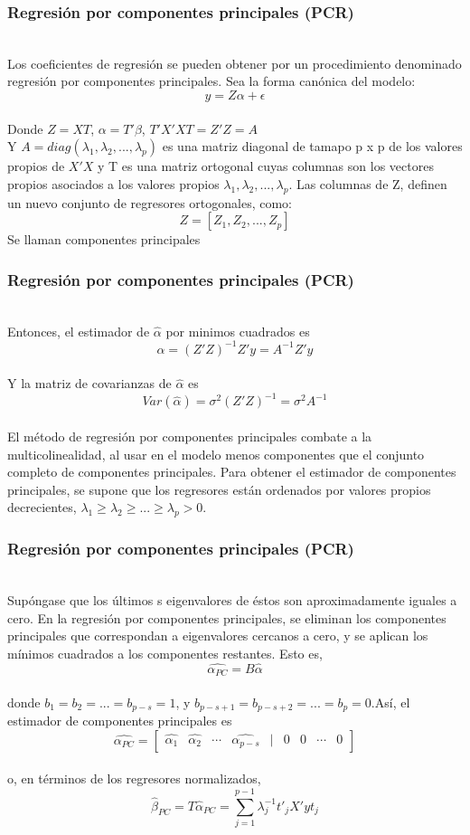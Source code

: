 \documentclass[12pt]{beamer}
\begin{document}
\begin{frame}
\frametitle{Regresión por componentes principales (PCR)}
~\\Los coeficientes de regresión se pueden obtener por un procedimiento denominado regresión por componentes principales. Sea la forma canónica del modelo:
$$y=Z\alpha+\epsilon$$
~\\Donde $Z=XT$, $\alpha=T'\beta$,  $T'X'XT=Z'Z=A$ 
~\\Y $A=diag(\lambda_{1},\lambda_{2},...,\lambda_{p})$ es una matriz diagonal de tamapo p x p de los valores propios de $X'X$ y T es una matriz ortogonal cuyas columnas son los vectores propios asociados a los valores propios $\lambda_{1},\lambda_{2},...,\lambda_{p}$. Las columnas de Z, definen un nuevo conjunto de regresores ortogonales, como:
$$Z=[Z_{1},Z_{2},...,Z_{p}]$$ Se llaman componentes principales
\end{frame}

\begin{frame}
\frametitle{Regresión por componentes principales (PCR)}
~\\Entonces, el estimador de $\hat{\alpha}$ por minimos cuadrados es
$$\hat{\alpha}=(Z'Z)^{-1}Z'y= A^{-1}Z'y$$
~\\Y la matriz de covarianzas de $\hat{\alpha}$ es 
$$Var(\hat{\alpha})=\sigma^2 (Z'Z)^{-1}=\sigma^2 A^{-1}$$
~\\El método de regresión por componentes principales combate a la multicolinealidad,
al usar en el modelo menos componentes que el conjunto completo de componentes principales. Para obtener el estimador de componentes principales, se supone que los regresores están ordenados por valores propios decrecientes, $\lambda_{1}\geq\lambda_{2}\geq...\geq\lambda_{p}>0$.
\end{frame}

\begin{frame}
\frametitle{Regresión por componentes principales (PCR)}
~\\Supóngase que los últimos s eigenvalores de éstos son aproximadamente iguales a cero. En la regresión por componentes principales, se eliminan los componentes principales que correspondan a eigenvalores cercanos a cero, y se aplican los mínimos cuadrados a los componentes restantes.
Esto es,
$$\hat{\alpha_{PC}}=B\hat{\alpha}$$
~\\donde $b_{1}=b_{2}=...=b_{p-s}=1$, y $b_{p-s+1}=b_{p-s+2}=...=b_{p}=0$.Así, el estimador de componentes principales es
$$\hat{\alpha_{PC}}=\left[\begin{matrix}
\hat{\alpha_{1}} & \hat{\alpha_{2}} & \cdots & \hat{\alpha_{p-s}} & | & 0 & 0 & \cdots & 0
\end{matrix}\right]$$ 
~\\ o, en términos de los regresores normalizados,
$$\hat{\beta}_{PC}=T\hat{\alpha}_{PC}=\sum\limits_{j=1}^{p-1}\lambda_{j}^{-1}t'_{j}X'yt_{j}$$
\end{frame}
\end{document}
